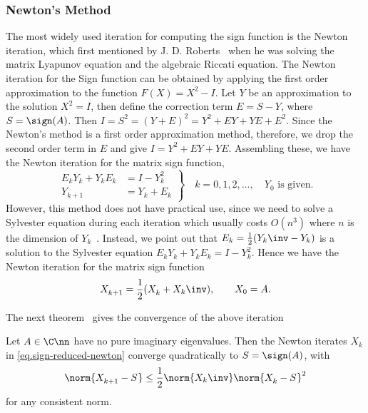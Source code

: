 \subsubsection{Newton's Method}
The most widely used iteration for computing the sign function is the
Newton iteration, which first mentioned by J. D. Roberts~ when he was solving the matrix Lyapunov equation and the
algebraic Riccati equation. The Newton iteration for the Sign function can
be obtained by applying the first order approximation to the function
$F(X) = X^{2} - I$. Let $Y$ be an approximation to the solution
$X^{2} = I$, then define the correction term $E = S - Y$, where
$S = \sign(A)$. Then $I = S^{2} = (Y+E)^{2} = Y^{2} + EY + YE + E^{2}$.
Since the Newton's method is a first order approximation method, therefore,
we drop the second order term in $E$ and give $I = Y^{2} + EY + YE$.
Assembling these, we have the Newton iteration for the matrix sign
function,
\begin{equation}
  \label{eq.sign-full-newton}
  \left.
  \begin{aligned}
    E_{k}Y_{k} + Y_{k}E_{k} & = I - Y_{k}^{2} \   \\
    Y_{k+1} & = Y_{k} + E_{k} 
  \end{aligned}
  \right\}
  \quad k = 0,1,2,\dots, \quad Y_{0} \text{ is given.}
\end{equation}
However, this method does not have practical use, since we need to solve a
Sylvester equation during each iteration which usually costs $O(n^{3})$
where $n$ is the dimension of $Y_{k}$~.
Instead, we point out that $E_{k} = \frac{1}{2}(Y_{k}\inv - Y_{k})$ is a
solution to the Sylvester equation
$E_{k}^{}Y_{k}^{} + Y_{k}^{}E_{k}^{} = I - Y_{k}^{2}$. Hence we have the
Newton iteration for the matrix sign function
\begin{equation}\label{eq.sign-reduced-newton}
  X_{k+1}^{} = \frac{1}{2}(X_{k}^{} + X_{k}\inv), \qquad X_{0} = A. 
\end{equation}

The next theorem~ gives the convergence of
the above iteration
\begin{theorem}
\label{thm.conv-new-sign}
Let $A\in\C\nn$ have no pure imaginary eigenvalues. Then the Newton
iterates $X_{k}$ in \eqref{eq.sign-reduced-newton} converge quadratically
to $S = \sign(A)$, with
\begin{equation}\notag
  \norm{X^{}_{k+1} - S_{}^{}} \leq \frac{1}{2}
  \norm{X_{k}\inv}\norm{X_{k}^{}-S^{}_{}}^{2} 
\end{equation}
for any consistent norm.
\end{theorem}

